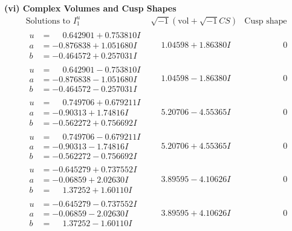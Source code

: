 \documentclass[1p]{elsarticle_modified}
\theoremstyle{definition}
\newcommand{\I}{\sqrt{-1}}
\begin{document}
\newpage\flushleft \textbf{(vi) Complex Volumes and Cusp Shapes}
$$\begin{array}{c|c|c}  
\text{Solutions to }I^u_{1}& \I (\text{vol} + \sqrt{-1}CS) & \text{Cusp shape}\\
 \hline 
\begin{aligned}
u &= \phantom{-}0.642901 + 0.753810 I \\
a &= -0.876838 + 1.051680 I \\
b &= -0.464572 + 0.257031 I\end{aligned}
 & \phantom{-}1.04598 + 1.86380 I & \phantom{-0.000000 } 0 \\ \hline\begin{aligned}
u &= \phantom{-}0.642901 - 0.753810 I \\
a &= -0.876838 - 1.051680 I \\
b &= -0.464572 - 0.257031 I\end{aligned}
 & \phantom{-}1.04598 - 1.86380 I & \phantom{-0.000000 } 0 \\ \hline\begin{aligned}
u &= \phantom{-}0.749706 + 0.679211 I \\
a &= -0.90313 + 1.74816 I \\
b &= -0.562272 + 0.756692 I\end{aligned}
 & \phantom{-}5.20706 - 4.55365 I & \phantom{-0.000000 } 0 \\ \hline\begin{aligned}
u &= \phantom{-}0.749706 - 0.679211 I \\
a &= -0.90313 - 1.74816 I \\
b &= -0.562272 - 0.756692 I\end{aligned}
 & \phantom{-}5.20706 + 4.55365 I & \phantom{-0.000000 } 0 \\ \hline\begin{aligned}
u &= -0.645279 + 0.737552 I \\
a &= -0.06859 + 2.02630 I \\
b &= \phantom{-}1.37252 + 1.60110 I\end{aligned}
 & \phantom{-}3.89595 - 4.10626 I & \phantom{-0.000000 } 0 \\ \hline\begin{aligned}
u &= -0.645279 - 0.737552 I \\
a &= -0.06859 - 2.02630 I \\
b &= \phantom{-}1.37252 - 1.60110 I\end{aligned}
 & \phantom{-}3.89595 + 4.10626 I & \phantom{-0.000000 } 0 \\ \hline\begin{aligned}

\end{aligned}
\end{array}$$
\end{document}
